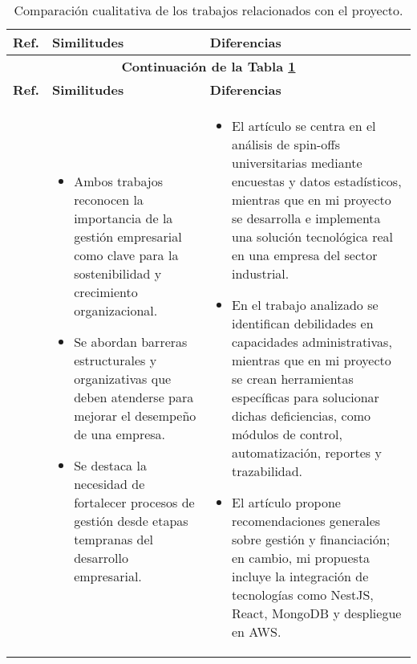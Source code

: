 \begin{longtable}{m{.05\paperwidth} *{2}{m{.33\paperwidth}} @{}}
	\caption{Comparación cualitativa de los trabajos relacionados con el proyecto.}
	\label{table:trabajosRelacionados}\\
	\hline
	\textbf{Ref.} & \textbf{Similitudes} & \textbf{Diferencias} \\
	\hline
	\endfirsthead
	
	\multicolumn{3}{c}{\textbf{Continuación de la Tabla \ref{table:trabajosRelacionados}}} \\
	\hline
	\textbf{Ref.} & \textbf{Similitudes} & \textbf{Diferencias} \\
	\hline
	\endhead
	\hline
	\endlastfoot
	
	\cite{Rodeiro2012} &
\begin{itemize}[topsep=0pt,itemsep=0pt,parsep=0pt,partopsep=0pt,leftmargin=*]
	\item Ambos trabajos reconocen la importancia de la gestión empresarial como clave para la sostenibilidad y crecimiento organizacional.
	\item Se abordan barreras estructurales y organizativas que deben atenderse para mejorar el desempeño de una empresa.
	\item Se destaca la necesidad de fortalecer procesos de gestión desde etapas tempranas del desarrollo empresarial.
\end{itemize} &
\begin{itemize}[topsep=0pt,itemsep=0pt,parsep=0pt,partopsep=0pt,leftmargin=*]
	\item El artículo se centra en el análisis de spin-offs universitarias mediante encuestas y datos estadísticos, mientras que en mi proyecto se desarrolla e implementa una solución tecnológica real en una empresa del sector industrial.
	\item En el trabajo analizado se identifican debilidades en capacidades administrativas, mientras que en mi proyecto se crean herramientas específicas para solucionar dichas deficiencias, como módulos de control, automatización, reportes y trazabilidad.
	\item El artículo propone recomendaciones generales sobre gestión y financiación; en cambio, mi propuesta incluye la integración de tecnologías como NestJS, React, MongoDB y despliegue en AWS.
\end{itemize} \\
\midrule
	

\end{longtable}

